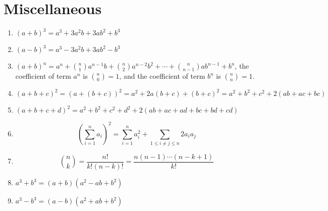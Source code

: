 \documentclass[11pt, oneside]{article}   	%
\begin{document}
\newpage 
\section{Miscellaneous} 
\begin{enumerate}
\item $(a+b)^3=a^3+3a^2b+3ab^2+b^3$ 
\item $(a-b)^3=a^3-3a^2b+3ab^2-b^3$ 
\item $(a+b)^n=a^n+\binom{n}{1}a^{n-1}b+\binom{n}{2}a^{n-2}b^2+\cdots+\binom{n}{n-1}ab^{n-1}+b^n$, the coefficient of term $a^n$ is $\binom{n}{0}=1$, and the coefficient of term $b^n$ is $\binom{n}{n}=1$. 
\item $(a+b+c)^2=(a+(b+c))^2=a^2+2a(b+c)+(b+c)^2=a^2+b^2+c^2+2(ab+ac+bc)$
\item $(a+b+c+d)^2=a^2+b^2+c^2+d^2+2(ab+ac+ad+bc+bd+cd)$
\item \[\left(\sum^n_{i=1} a_i\right)^2=\sum^n_{i=1} a_i^2+\sum_{1 \le i \ne j \le n} 2a_i a_j \]
\item \[\binom{n}{k}=\frac{n!}{k!(n-k)!}=\frac{n(n-1)\cdots(n-k+1)}{k!}\]
\item $a^3 + b^3 = (a+b) (a^2-ab+b^2)$ 
\item $a^3 - b^3 = (a-b) (a^2 + ab +b^2)$ 
\end{enumerate}







\end{document}
